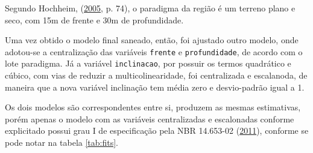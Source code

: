 \documentclass[a4paper, 12pt]{article}
\begin{document}
Segundo Hochheim, (\protect\hyperlink{ref-hochheim2005}{2005}, p. 74), o
paradigma da região é um terreno plano e seco, com 15m de frente e 30m
de profundidade.

Uma vez obtido o modelo final saneado, então, foi ajustado outro modelo,
onde adotou-se a centralização das variáveis \texttt{frente} e
\texttt{profundidade}, de acordo com o lote paradigma. Já a variável
\texttt{inclinacao}, por possuir os termos quadrático e cúbico, com vias
de reduzir a multicolinearidade, foi centralizada e escalanoda, de
maneira que a nova variável inclinação tem média zero e desvio-padrão
igual a 1.

Os dois modelos são correspondentes entre si, produzem as mesmas
estimativas, porém apenas o modelo com as variáveis centralizadas e
escalonadas conforme explicitado possui grau I de especificação pela NBR
14.653-02 (\protect\hyperlink{ref-NBR1465302}{2011}), conforme se pode
notar na tabela \ref{tab:fits}.
\end{document}
